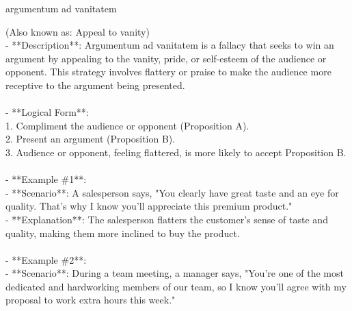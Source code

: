 \documentclass[a4paper,12pt,single,pdftex]{scrbook}
\begin{document}
argumentum ad vanitatem
    
      (Also known as: Appeal to vanity)
    \\

  
    
      - **Description**: Argumentum ad vanitatem is a fallacy that seeks to win an argument by appealing to the vanity, pride, or self-esteem of the audience or opponent. This strategy involves flattery or praise to make the audience more receptive to the argument being presented.
    \\

    
      
    \\

    
      - **Logical Form**:
    \\

    
        1. Compliment the audience or opponent (Proposition A).
    \\

    
        2. Present an argument (Proposition B).
    \\

    
        3. Audience or opponent, feeling flattered, is more likely to accept Proposition B.
    \\

    
      
    \\

    
      - **Example \#1**:
    \\

    
        - **Scenario**: A salesperson says, "You clearly have great taste and an eye for quality. That's why I know you'll appreciate this premium product."
    \\

    
        - **Explanation**: The salesperson flatters the customer's sense of taste and quality, making them more inclined to buy the product.
    \\

    
      
    \\

    
      - **Example \#2**:
    \\

    
        - **Scenario**: During a team meeting, a manager says, "You're one of the most dedicated and hardworking members of our team, so I know you'll agree with my proposal to work extra hours this week."
    \\
\end{document}
